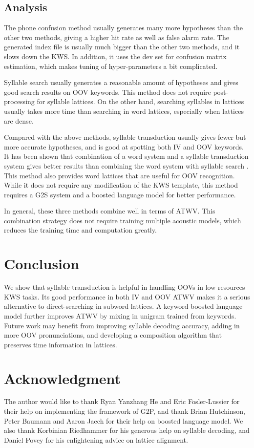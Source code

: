 \documentclass[journal]{IEEEtran}
\begin{document}
\subsection{Analysis}
The phone confusion method usually generates many more hypotheses than the other two methods, giving a higher hit rate as well as
false alarm rate. The generated index file is usually much bigger than the other two methods, and it slows down the KWS. 
In addition, it uses the dev set for confusion matrix estimation, which makes tuning of hyper-parameters a bit complicated.

Syllable search usually generates a reasonable amount of hypotheses and gives good search results on OOV keywords. This
method does not require post-processing for syllable lattices. On the other hand, searching syllables in lattices 
usually takes more time than searching in word lattices, especially when lattices are dense.

Compared with the above methods, syllable transduction usually gives fewer but more accurate hypotheses, and is good 
at spotting both IV and OOV keywords. It has been shown that combination of a word system and a syllable transduction 
system gives better results than combining the word system with syllable search \cite{hang2014syllable}. This method 
also provides word lattices that are useful for OOV recognition. While it does not require any modification 
of the KWS template, this method requires a G2S system and a boosted language model for better performance. 

In general, these three methods combine well in terms of ATWV. This combination strategy does not require
training multiple acoustic models, which reduces the training time and computation greatly.

\section{Conclusion}
We show that syllable transduction is helpful in handling OOVs in low resources KWS tasks. 
Its good performance in both IV and OOV ATWV makes it a serious alternative to direct-searching in subword lattices. 
A keyword boosted language model further improves ATWV by mixing in unigram trained from keywords. Future 
work may benefit from improving syllable decoding accuracy, adding in more OOV pronunciations, and developing a
composition algorithm that preserves time information in lattices.

\section*{Acknowledgment}
The author would like to thank Ryan Yanzhang He and Eric Fosler-Lussier for their help on implementing 
the framework of G2P, and thank Brian Hutchinson, Peter Baumann and Aaron Jaech for their help on 
boosted language model. We also thank Korbinian Riedhammer for his generous help on syllable decoding, 
and Daniel Povey for his enlightening advice on lattice alignment.
\end{document}
